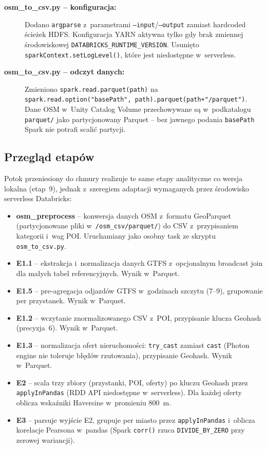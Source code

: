 \documentclass{labreport}
\begin{document}
\begin{description}
    \item[\textbf{osm\_to\_csv.py -- konfiguracja:}] Dodano \texttt{argparse} z~parametrami \texttt{--input}/\texttt{--output} zamiast hardcoded ścieżek HDFS. Konfiguracja YARN aktywna tylko gdy brak zmiennej środowiskowej \texttt{DATABRICKS\_RUNTIME\_VERSION}. Usunięto \texttt{spark\-Context.setLog\-Level()}, które jest niedostępne w~serverless.

    \item[\textbf{osm\_to\_csv.py -- odczyt danych:}] Zmieniono \texttt{spark.read.parquet(path)} na \texttt{spark.read.option("basePath",~path).parquet(path+"/parquet")}. Dane OSM w~Unity Catalog Volume przechowywane są w~podkatalogu \texttt{parquet/} jako partycjonowany Parquet -- bez jawnego podania \texttt{basePath} Spark nie potrafi scalić partycji.
\end{description}

\subsection{Przegląd etapów}

Potok przeniesiony do chmury realizuje te same etapy analityczne co wersja lokalna (etap~9), jednak z~szeregiem adaptacji wymaganych przez środowisko serverless Databricks:

\begin{itemize}
    \item \textbf{osm\_preprocess} -- konwersja danych OSM z~formatu GeoParquet (partycjonowane pliki w~\texttt{/osm\_csv/parquet/}) do CSV z~przypisaniem kategorii i~wag POI. Uruchamiany jako osobny task ze skryptu \texttt{osm\_to\_csv.py}.
    \item \textbf{E1.1} -- ekstrakcja i~normalizacja danych GTFS z~opcjonalnym broadcast join dla małych tabel referencyjnych. Wynik w~Parquet.
    \item \textbf{E1.5} -- pre-agregacja odjazdów GTFS w~godzinach szczytu (7--9), grupowanie per przystanek. Wynik w~Parquet.
    \item \textbf{E1.2} -- wczytanie znormalizowanego CSV z~POI, przypisanie klucza Geohash (precyzja~6). Wynik w~Parquet.
    \item \textbf{E1.3} -- normalizacja ofert nieruchomości: \texttt{try\_cast} zamiast \texttt{cast} (Photon engine nie toleruje błędów rzutowania), przypisanie Geohash. Wynik w~Parquet.
    \item \textbf{E2} -- scala trzy zbiory (przystanki, POI, oferty) po kluczu Geohash przez \texttt{applyInPandas} (RDD API niedostępne w~serverless). Dla każdej oferty oblicza wskaźniki Haversine w~promieniu 800~m.
    \item \textbf{E3} -- parsuje wyjście E2, grupuje per miasto przez \texttt{applyInPandas} i~oblicza korelacje Pearsona w~pandas (Spark \texttt{corr()} rzuca \texttt{DIVIDE\_BY\_ZERO} przy zerowej wariancji).
\end{itemize}
\end{document}
